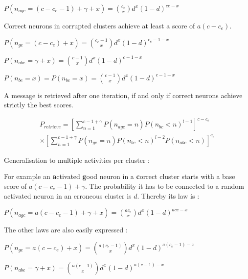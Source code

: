 \documentclass[english,11pt,twocolumn]{article}
\theoremstyle{definition}
\begin{document}
	$P(n_{agc} = (c - c_e - 1) + \gamma + x) = {c_e \choose x} d^x (1-d)^{ce-x}$
	
	Correct neurons in corrupted clusters achieve at least a score of $a(c - c_e)$. 
	
	$P(n_{ge} = (c - c_e) + x) = {c_e - 1 \choose x} d^x (1-d)^{c_e-1-x}$
	
	$P(n_{abe} = \gamma + x) = {c - 1 \choose x} d^x (1-d)^{c-1-x}$
	
	$P(n_{be} = x) = P(n_{bc} = x) = {c - 1 \choose x} d^x (1-d)^{c- 1 -x}$
	
	A message is retrieved after one iteration, if and only if correct neurons achieve strictly the best scores.	
	
	
	\begin{align*}
	P_{retrieve} = \left [ \sum_{n = 1}^{c-1+\gamma} P(n_{agc} = n)  P(n_{bc} < n)^{l-1} \right ]^{c - c_e} \\ \times \left [ \sum_{n = 1}^{c-1+\gamma} P(n_{ge} = n) P(n_{bc} < n)^{l-2} P(n_{abc} < n) \right ]^{c_e}
	\end{align*}

	
	
	Generalisation to multiple activities per cluster :
	
	For example an \textbf{a}ctivated \textbf{g}ood neuron in a \textbf{c}orrect cluster starts with a base score of $ a(c - c_e - 1) + \gamma$. The probability it has to be connected to a random activated neuron in an erroneous cluster is $d$. Thereby its law is :
	
	$P(n_{agc} = a(c - c_e - 1) + \gamma + x) = {a c_e \choose x} d^x (1-d)^{a ce-x}$
	
	The other laws are also easily expressed : 
	
	$P(n_{ge} = a(c - c_e) + x) = {a (c_e - 1) \choose x} d^x (1-d)^{a (c_e - 1)-x}$
	
	$P(n_{abe} = \gamma + x) = {a(c - 1) \choose x} d^x (1-d)^{a(c-1)-x}$
	
\end{document}
